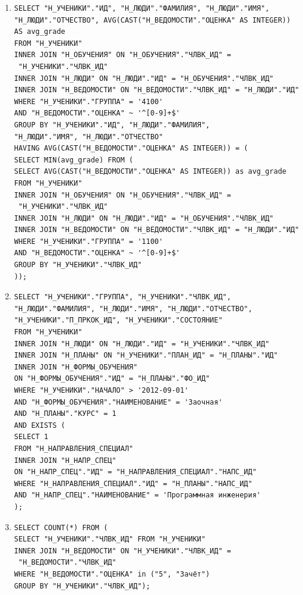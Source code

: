 \begin{enumerate}
\item 
\begin{verbatim} 
SELECT "Н_УЧЕНИКИ"."ИД", "Н_ЛЮДИ"."ФАМИЛИЯ", "Н_ЛЮДИ"."ИМЯ",
"Н_ЛЮДИ"."ОТЧЕСТВО", AVG(CAST("Н_ВЕДОМОСТИ"."ОЦЕНКА" AS INTEGER)) 
AS avg_grade
FROM "Н_УЧЕНИКИ"
INNER JOIN "Н_ОБУЧЕНИЯ" ON "Н_ОБУЧЕНИЯ"."ЧЛВК_ИД" =
 "Н_УЧЕНИКИ"."ЧЛВК_ИД"
INNER JOIN "Н_ЛЮДИ" ON "Н_ЛЮДИ"."ИД" = "Н_ОБУЧЕНИЯ"."ЧЛВК_ИД"
INNER JOIN "Н_ВЕДОМОСТИ" ON "Н_ВЕДОМОСТИ"."ЧЛВК_ИД" = "Н_ЛЮДИ"."ИД" 
WHERE "Н_УЧЕНИКИ"."ГРУППА" = '4100'
AND "Н_ВЕДОМОСТИ"."ОЦЕНКА" ~ '^[0-9]+$'
GROUP BY "Н_УЧЕНИКИ"."ИД", "Н_ЛЮДИ"."ФАМИЛИЯ", 
"Н_ЛЮДИ"."ИМЯ", "Н_ЛЮДИ"."ОТЧЕСТВО"
HAVING AVG(CAST("Н_ВЕДОМОСТИ"."ОЦЕНКА" AS INTEGER)) = (
SELECT MIN(avg_grade) FROM (
SELECT AVG(CAST("Н_ВЕДОМОСТИ"."ОЦЕНКА" AS INTEGER)) as avg_grade
FROM "Н_УЧЕНИКИ"
INNER JOIN "Н_ОБУЧЕНИЯ" ON "Н_ОБУЧЕНИЯ"."ЧЛВК_ИД" =
 "Н_УЧЕНИКИ"."ЧЛВК_ИД"
INNER JOIN "Н_ЛЮДИ" ON "Н_ЛЮДИ"."ИД" = "Н_ОБУЧЕНИЯ"."ЧЛВК_ИД"
INNER JOIN "Н_ВЕДОМОСТИ" ON "Н_ВЕДОМОСТИ"."ЧЛВК_ИД" = "Н_ЛЮДИ"."ИД"
WHERE "Н_УЧЕНИКИ"."ГРУППА" = '1100'
AND "Н_ВЕДОМОСТИ"."ОЦЕНКА" ~ '^[0-9]+$'
GROUP BY "Н_УЧЕНИКИ"."ЧЛВК_ИД"
));
\end{verbatim}

\item 
\begin{verbatim} 
SELECT "Н_УЧЕНИКИ"."ГРУППА", "Н_УЧЕНИКИ"."ЧЛВК_ИД",
"Н_ЛЮДИ"."ФАМИЛИЯ", "Н_ЛЮДИ"."ИМЯ", "Н_ЛЮДИ"."ОТЧЕСТВО",
"Н_УЧЕНИКИ"."П_ПРКОК_ИД", "Н_УЧЕНИКИ"."СОСТОЯНИЕ"
FROM "Н_УЧЕНИКИ"
INNER JOIN "Н_ЛЮДИ" ON "Н_ЛЮДИ"."ИД" = "Н_УЧЕНИКИ"."ЧЛВК_ИД"
INNER JOIN "Н_ПЛАНЫ" ON "Н_УЧЕНИКИ"."ПЛАН_ИД" = "Н_ПЛАНЫ"."ИД"
INNER JOIN "Н_ФОРМЫ_ОБУЧЕНИЯ" 
ON "Н_ФОРМЫ_ОБУЧЕНИЯ"."ИД" = "Н_ПЛАНЫ"."ФО_ИД"
WHERE "Н_УЧЕНИКИ"."НАЧАЛО" > '2012-09-01'
AND "Н_ФОРМЫ_ОБУЧЕНИЯ"."НАИМЕНОВАНИЕ" = 'Заочная'
AND "Н_ПЛАНЫ"."КУРС" = 1
AND EXISTS (
SELECT 1
FROM "Н_НАПРАВЛЕНИЯ_СПЕЦИАЛ"
INNER JOIN "Н_НАПР_СПЕЦ"
ON "Н_НАПР_СПЕЦ"."ИД" = "Н_НАПРАВЛЕНИЯ_СПЕЦИАЛ"."НАПС_ИД"
WHERE "Н_НАПРАВЛЕНИЯ_СПЕЦИАЛ"."ИД" = "Н_ПЛАНЫ"."НАПС_ИД"
AND "Н_НАПР_СПЕЦ"."НАИМЕНОВАНИЕ" = 'Программная инженерия'
);
\end{verbatim}

\item 
\begin{verbatim} 
SELECT COUNT(*) FROM (
SELECT "Н_УЧЕНИКИ"."ЧЛВК_ИД" FROM "Н_УЧЕНИКИ"
INNER JOIN "Н_ВЕДОМОСТИ" ON "Н_УЧЕНИКИ"."ЧЛВК_ИД" =
 "Н_ВЕДОМОСТИ"."ЧЛВК_ИД"
WHERE "Н_ВЕДОМОСТИ"."ОЦЕНКА" in ("5", "Зачёт")
GROUP BY "Н_УЧЕНИКИ"."ЧЛВК_ИД");
\end{verbatim}

\end{enumerate}

